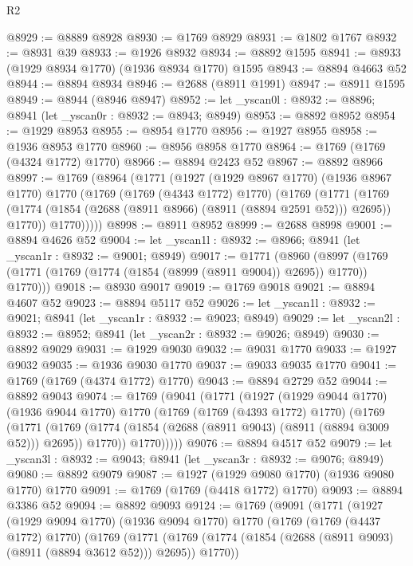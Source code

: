 \begin{lexlean}{R2}
\begin{coremodule}
@8929 := @8889 @8928
@8930 := @1769 @8929
@8931 := @1802 @1767
@8932 := @8931 @39
@8933 := @1926 @8932
@8934 := @8892 @1595
@8941 := @8933 (@1929 @8934 @1770) (@1936 @8934 @1770) @1595
@8943 := @8894 @4663 @52
@8944 := @8894 @8934
@8946 := @2688 (@8911 @1991)
@8947 := @8911 @1595
@8949 := @8944 (@8946 @8947)
@8952 := let _yscan0l : @8932 := @8896; @8941 (let _yscan0r : @8932 := @8943; @8949)
@8953 := @8892 @8952
@8954 := @1929 @8953
@8955 := @8954 @1770
@8956 := @1927 @8955
@8958 := @1936 @8953 @1770
@8960 := @8956 @8958 @1770
@8964 := @1769 (@1769 (@4324 @1772) @1770)
@8966 := @8894 @2423 @52
@8967 := @8892 @8966
@8997 := @1769
    (@8964
      (@1771
        (@1927
          (@1929 @8967 @1770)
          (@1936 @8967 @1770)
          @1770
          (@1769
            (@1769 (@4343 @1772) @1770)
            (@1769
              (@1771
                (@1769 (@1774 (@1854 (@2688 (@8911 @8966) (@8911 (@8894 @2591 @52))) @2695)) @1770))
              @1770)))))
@8998 := @8911 @8952
@8999 := @2688 @8998
@9001 := @8894 @4626 @52
@9004 := let _yscan1l : @8932 := @8966; @8941 (let _yscan1r : @8932 := @9001; @8949)
@9017 := @1771
    (@8960 (@8997 (@1769 (@1771 (@1769 (@1774 (@1854 (@8999 (@8911 @9004)) @2695)) @1770)) @1770)))
@9018 := @8930 @9017
@9019 := @1769 @9018
@9021 := @8894 @4607 @52
@9023 := @8894 @5117 @52
@9026 := let _yscan1l : @8932 := @9021; @8941 (let _yscan1r : @8932 := @9023; @8949)
@9029 := let _yscan2l : @8932 := @8952; @8941 (let _yscan2r : @8932 := @9026; @8949)
@9030 := @8892 @9029
@9031 := @1929 @9030
@9032 := @9031 @1770
@9033 := @1927 @9032
@9035 := @1936 @9030 @1770
@9037 := @9033 @9035 @1770
@9041 := @1769 (@1769 (@4374 @1772) @1770)
@9043 := @8894 @2729 @52
@9044 := @8892 @9043
@9074 := @1769
    (@9041
      (@1771
        (@1927
          (@1929 @9044 @1770)
          (@1936 @9044 @1770)
          @1770
          (@1769
            (@1769 (@4393 @1772) @1770)
            (@1769
              (@1771
                (@1769 (@1774 (@1854 (@2688 (@8911 @9043) (@8911 (@8894 @3009 @52))) @2695)) @1770))
              @1770)))))
@9076 := @8894 @4517 @52
@9079 := let _yscan3l : @8932 := @9043; @8941 (let _yscan3r : @8932 := @9076; @8949)
@9080 := @8892 @9079
@9087 := @1927 (@1929 @9080 @1770) (@1936 @9080 @1770) @1770
@9091 := @1769 (@1769 (@4418 @1772) @1770)
@9093 := @8894 @3386 @52
@9094 := @8892 @9093
@9124 := @1769
    (@9091
      (@1771
        (@1927
          (@1929 @9094 @1770)
          (@1936 @9094 @1770)
          @1770
          (@1769
            (@1769 (@4437 @1772) @1770)
            (@1769
              (@1771
                (@1769 (@1774 (@1854 (@2688 (@8911 @9093) (@8911 (@8894 @3612 @52))) @2695)) @1770))

\end{coremodule}
\end{lexlean}
